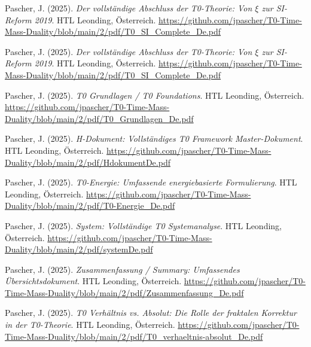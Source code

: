\documentclass{article}
\begin{document}
	\begin{thebibliography}{99}
		
Pascher, J. (2025).
\textit{Der vollst{\"a}ndige Abschluss der T0-Theorie: Von $\xi$ zur SI-Reform 2019}.
HTL Leonding, {\"O}sterreich.
\url{https://github.com/jpascher/T0-Time-Mass-Duality/blob/main/2/pdf/T0_SI_Complete_De.pdf}
		
		Pascher, J. (2025).
		\textit{Der vollst{\"a}ndige Abschluss der T0-Theorie: Von $\xi$ zur SI-Reform 2019}.
		HTL Leonding, {\"O}sterreich.
		\url{https://github.com/jpascher/T0-Time-Mass-Duality/blob/main/2/pdf/T0_SI_Complete_De.pdf}
		
		Pascher, J. (2025).
		\textit{T0 Grundlagen / T0 Foundations}.
		HTL Leonding, Österreich.
		\url{https://github.com/jpascher/T0-Time-Mass-Duality/blob/main/2/pdf/T0_Grundlagen_De.pdf}
		
		Pascher, J. (2025).
		\textit{H-Dokument: Vollständiges T0 Framework Master-Dokument}.
		HTL Leonding, Österreich.
		\url{https://github.com/jpascher/T0-Time-Mass-Duality/blob/main/2/pdf/HdokumentDe.pdf}
		
		Pascher, J. (2025).
		\textit{T0-Energie: Umfassende energiebasierte Formulierung}.
		HTL Leonding, Österreich.
		\url{https://github.com/jpascher/T0-Time-Mass-Duality/blob/main/2/pdf/T0-Energie_De.pdf}
		
		Pascher, J. (2025).
		\textit{System: Vollständige T0 Systemanalyse}.
		HTL Leonding, Österreich.
		\url{https://github.com/jpascher/T0-Time-Mass-Duality/blob/main/2/pdf/systemDe.pdf}
		
		Pascher, J. (2025).
		\textit{Zusammenfassung / Summary: Umfassendes Übersichtsdokument}.
		HTL Leonding, Österreich.
		\url{https://github.com/jpascher/T0-Time-Mass-Duality/blob/main/2/pdf/Zusammenfassung_De.pdf}
		
		Pascher, J. (2025).
		\textit{T0 Verhältnis vs. Absolut: Die Rolle der fraktalen Korrektur in der T0-Theorie}.
		HTL Leonding, Österreich.
		\url{https://github.com/jpascher/T0-Time-Mass-Duality/blob/main/2/pdf/T0_verhaeltnis-absolut_De.pdf}
		
		
		

\end{thebibliography}
\end{document}
